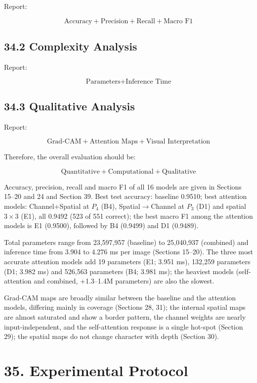 \documentclass[10pt]{article}
\begin{document}
Report:

\[
\boxed{
\text{Accuracy}
+
\text{Precision}
+
\text{Recall}
+
\text{Macro F1}
}
\]

\subsection*{34.2 Complexity Analysis}

Report:

\[
\boxed{
\text{Parameters}
+
\text{Inference Time}
}
\]

\subsection*{34.3 Qualitative Analysis}

Report:

\[
\boxed{
\text{Grad-CAM}
+
\text{Attention Maps}
+
\text{Visual Interpretation}
}
\]

Therefore, the overall evaluation should be:

\[
\boxed{
\text{Quantitative}
+
\text{Computational}
+
\text{Qualitative}
}
\]


Accuracy, precision, recall and macro F1 of all 16 models are given in Sections 15--20 and 24 and Section 39. Best test accuracy: baseline 0.9510; best attention models: Channel+Spatial at $P_4$ (B4), Spatial$\rightarrow$Channel at $P_3$ (D1) and spatial $3\times3$ (E1), all 0.9492 (523 of 551 correct); the best macro F1 among the attention models is E1 (0.9500), followed by B4 (0.9499) and D1 (0.9489).


Total parameters range from 23{,}597{,}957 (baseline) to 25{,}040{,}937 (combined) and inference time from 3.904 to 4.276 ms per image (Sections 15--20). The three most accurate attention models add 19 parameters (E1; 3.951 ms), 132{,}259 parameters (D1; 3.982 ms) and 526{,}563 parameters (B4; 3.981 ms);
the heaviest models (self-attention and combined, +1.3--1.4M parameters) are also the slowest.


Grad-CAM maps are broadly similar between the baseline and the attention models, differing mainly in coverage (Sections 28, 31); the internal spatial maps are almost saturated and show a border pattern, the channel weights are nearly input-independent, and the self-attention response is a single hot-spot (Section 29);
the spatial maps do not change character with depth (Section 30).

\section*{35. Experimental Protocol}
\end{document}
